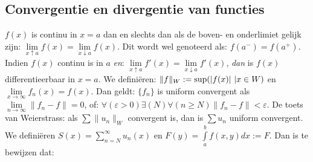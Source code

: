 \subsection{Convergentie en divergentie van functies}
\label{sec:convf}
$f(x)$ is continu in $x=a$ dan en slechts dan als de boven- en onderlimiet
gelijk zijn: $\lim\limits_{x\uparrow a}f(x)=\lim\limits_{x\downarrow a}f(x)$.
Dit wordt wel genoteerd als: $f(a^-)=f(a^+)$.
\npar
Indien $f(x)$ continu is in $a$ {\it en}:
$\lim\limits_{x\uparrow a}f'(x)=\lim\limits_{x\downarrow a}f'(x)$,
{\it dan} is $f(x)$ differentieerbaar in $x=a$.
\npar
We defini\"eren: $\|f\|_W:={\rm sup}(|f(x)|~|x\in W)$ en $\lim\limits_{x\rightarrow\infty}f_n(x)=f(x)$.
Dan geldt: $\{f_n\}$ is uniform convergent als $\lim\limits_{n\rightarrow\infty}\|f_n-f\|=0$,
of: $\forall(\varepsilon>0)\exists(N)\forall(n\geq N)\|f_n-f\|<\varepsilon$.
\npar
De toets van Weierstrass: als $\sum\|u_n\|_W$ convergent is, dan is $\sum u_n$
uniform convergent.
\npar
We defini\"eren $\displaystyle S(x)=\sum_{n=N}^\infty u_n(x)$ en
$\displaystyle F(y)=\int\limits_a^bf(x,y)dx:=F$. Dan is te bewijzen dat:
